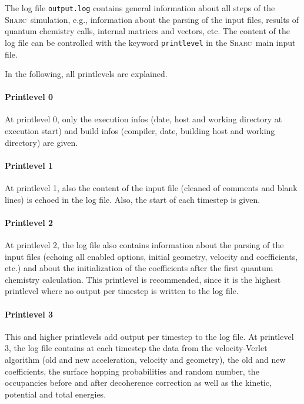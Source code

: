 \documentclass[a4paper,11pt,DIV=15,openany,twoside=false]{scrbook}
\newcommand{\sharc}{\textsc{Sharc}}
\newcommand{\ttt}[1]{\texttt{#1}}
\begin{document}
The log file \ttt{output.log} contains general information about all steps of the \sharc\ simulation, e.g., information about the parsing of the input files, results of quantum chemistry calls, internal matrices and vectors, etc. The content of the log file can be controlled with the keyword \ttt{printlevel} in the \sharc\ main input file.

In the following, all printlevels are explained.

\paragraph{Printlevel 0}

At printlevel 0, only the execution infos (date, host and working directory at execution start) and build infos (compiler, date, building host and working directory) are given.

\paragraph{Printlevel 1}

At printlevel 1, also the content of the input file (cleaned of comments and blank lines) is echoed in the log file. Also, the start of each timestep is given.

\paragraph{Printlevel 2}

At printlevel 2, the log file also contains information about the parsing of the input files (echoing all enabled options, initial geometry, velocity and coefficients, etc.) and about the initialization of the coefficients after the first quantum chemistry calculation. This printlevel is recommended, since it is the highest printlevel where no output per timestep is written to the log file.

\paragraph{Printlevel 3}

This and higher printlevels add output per timestep to the log file. At printlevel 3, the log file contains at each timestep the data from the velocity-Verlet algorithm (old and new acceleration, velocity and geometry), the old and new coefficients, the surface hopping probabilities and random number, the occupancies before and after decoherence correction as well as the kinetic, potential and total energies.
\end{document}
